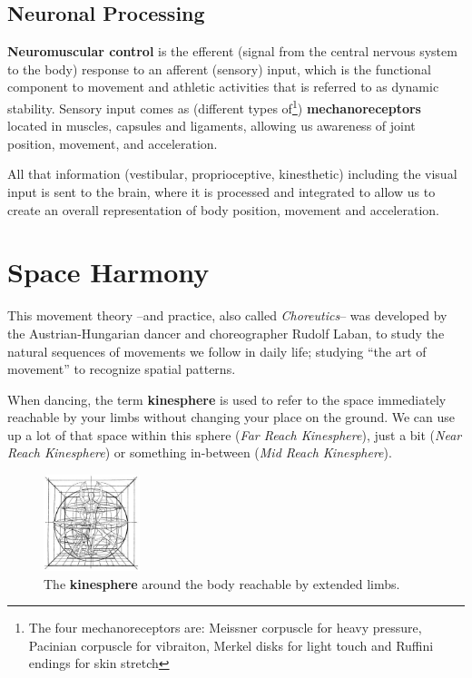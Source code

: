 \subsection{Neuronal Processing}\label{subsec:neuronal-processing}

\textbf{Neuromuscular control} is the efferent (signal from the central nervous system to the body) response to an afferent (sensory) input, which is the functional component to movement and athletic activities that is referred to as dynamic stability.
Sensory input comes as (different types of\footnote{The four mechanoreceptors are: Meissner corpuscle for heavy pressure, Pacinian corpuscle for vibraiton, Merkel disks for light touch and Ruffini endings for skin stretch}) \textbf{mechanoreceptors} located in muscles, capsules and ligaments, allowing us awareness of joint position, movement, and acceleration.

All that information (vestibular, proprioceptive, kinesthetic) including the visual input is sent to the brain, where it is processed and integrated to allow us to create an overall representation of body position, movement and acceleration.

\section{Space Harmony}\label{sec:space-harmony}

This movement theory --and practice, also called \textit{Choreutics}-- was developed by the Austrian-Hungarian dancer and choreographer Rudolf Laban, to study the natural sequences of movements we follow in daily life; studying ``the art of movement'' to recognize spatial patterns.

When dancing, the term \textbf{\gls{kinesphere}} is used to refer to the space immediately reachable by your limbs without changing your place on the ground.
We can use up a lot of that space within this sphere (\textit{Far Reach Kinesphere}), just a bit (\textit{Near Reach Kinesphere}) or something in-between (\textit{Mid Reach Kinesphere}).

\begin{figure}
    \centering
    \includegraphics[width=0.25\textwidth]{images/kinsphere}
    \caption{The \textbf{kinesphere} around the body reachable by extended limbs.}
\end{figure}

